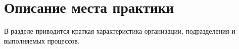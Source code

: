 \section{Описание места практики}

В разделе приводится краткая характеристика организации, подразделения и выполняемых процессов.
